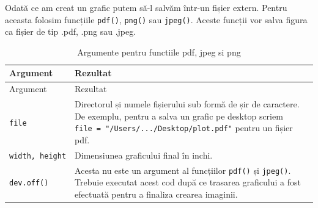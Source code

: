 \documentclass[]{article}
\begin{document}
Odată ce am creat un grafic putem să-l salvăm într-un fișier extern.
Pentru aceasta folosim funcțiile \texttt{pdf()}, \texttt{png()} sau
\texttt{jpeg()}. Aceste funcții vor salva figura ca fișier de tip .pdf,
.png sau .jpeg.

\begin{longtable}[]{@{}ll@{}}
\caption{Argumente pentru functiile pdf, jpeg si png}\tabularnewline
\toprule
\begin{minipage}[b]{0.14\columnwidth}\raggedright\strut
Argument\strut
\end{minipage} & \begin{minipage}[b]{0.71\columnwidth}\raggedright\strut
Rezultat\strut
\end{minipage}\tabularnewline
\midrule
\endfirsthead
\toprule
\begin{minipage}[b]{0.14\columnwidth}\raggedright\strut
Argument\strut
\end{minipage} & \begin{minipage}[b]{0.71\columnwidth}\raggedright\strut
Rezultat\strut
\end{minipage}\tabularnewline
\midrule
\endhead
\begin{minipage}[t]{0.14\columnwidth}\raggedright\strut
\texttt{file}\strut
\end{minipage} & \begin{minipage}[t]{0.71\columnwidth}\raggedright\strut
Directorul și numele fișierului sub formă de șir de caractere. De
exemplu, pentru a salva un grafic pe desktop scriem
\texttt{file\ =\ "/Users/.../Desktop/plot.pdf"} pentru un fișier
pdf.\strut
\end{minipage}\tabularnewline
\begin{minipage}[t]{0.14\columnwidth}\raggedright\strut
\texttt{width,\ height}\strut
\end{minipage} & \begin{minipage}[t]{0.71\columnwidth}\raggedright\strut
Dimensiunea graficului final în inchi.\strut
\end{minipage}\tabularnewline
\begin{minipage}[t]{0.14\columnwidth}\raggedright\strut
\texttt{dev.off()}\strut
\end{minipage} & \begin{minipage}[t]{0.71\columnwidth}\raggedright\strut
Acesta nu este un argument al funcțiilor \texttt{pdf()} și
\texttt{jpeg()}. Trebuie executat acest cod după ce trasarea graficului
a fost efectuată pentru a finaliza crearea imaginii.\strut
\end{minipage}\tabularnewline
\bottomrule
\end{longtable}
\end{document}
